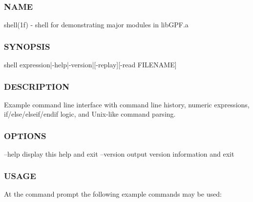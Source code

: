 \subsubsection*{N\+A\+ME}

shell(1f) -\/ shell for demonstrating major modules in lib\+G\+P\+F.\+a 

\subsubsection*{S\+Y\+N\+O\+P\+S\+IS}

\begin{DoxyVerb}    shell expression|-help|-version|[-replay][-read FILENAME]
\end{DoxyVerb}


\subsubsection*{D\+E\+S\+C\+R\+I\+P\+T\+I\+ON}

Example command line interface with command line history, numeric expressions, if/else/elseif/endif logic, and Unix-\/like command parsing.

\subsubsection*{O\+P\+T\+I\+O\+NS}

--help display this help and exit --version output version information and exit

\subsubsection*{U\+S\+A\+GE}

At the command prompt the following example commands may be used\+:

